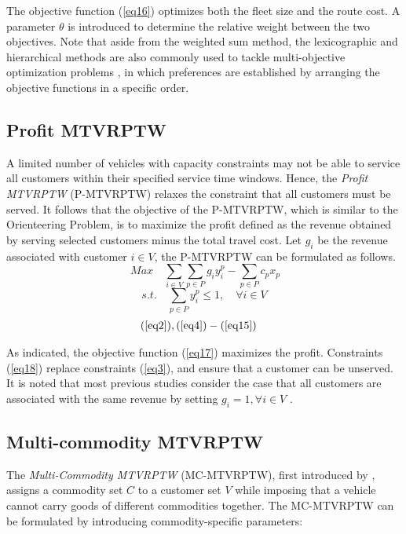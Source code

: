 \documentclass[11pt]{article}
\begin{document}
The objective function (\ref{eq16}) optimizes both the fleet size and the route cost.  A parameter $\theta$ is introduced to determine the relative weight between the two objectives.  Note that aside from the weighted sum method, the lexicographic and hierarchical methods are also commonly used to tackle multi-objective optimization problems \citep[e.g.,][]{arora2017multi}, in which preferences are established by arranging the objective functions in a specific order.

\subsection{Profit MTVRPTW}

A limited number of vehicles with capacity constraints may not be able to service all customers within their specified service time windows.  Hence, the \textit{Profit MTVRPTW} (P-MTVRPTW) relaxes the constraint that all customers must be served. It follows that the objective of the P-MTVRPTW, which is similar to the Orienteering Problem, is to maximize the profit defined as the revenue obtained by serving selected customers minus the total travel cost.  Let $g_i$ be the revenue associated with customer $i \in V$, the P-MTVRPTW can be formulated as follows.
\begin{equation} \ \label{eq17}
    Max \quad \sum_{i \in V} \sum_{p \in P} g_i y^p_i - \sum_{p \in P} c_p x_p
\end{equation}
\begin{equation} \label{eq18}
    s.t. \quad \sum_{p \in P} y^p_i \leq 1, \quad \forall i \in V
\end{equation}
\begin{align}
(\ref{eq2})&, (\ref{eq4})-(\ref{eq15}) \nonumber
\end{align}

As indicated, the objective function (\ref{eq17}) maximizes the profit. Constraints (\ref{eq18}) replace constraints (\ref{eq3}), and ensure that a customer can be unserved. It is noted that most previous studies consider the case that all customers are associated with the same revenue by setting $g_i = 1, \forall i \in V$ \citep[e.g.,][]{azi2010exact, macedo2011solving, macedo2012generalized, wang2014metaheuristic}.


\subsection{Multi-commodity MTVRPTW}
The \textit{Multi-Commodity MTVRPTW} (MC-MTVRPTW), first introduced by \cite{battarra2009adaptive}, assigns a commodity set $C$ to a customer set $V$ while imposing that a vehicle cannot carry goods of different commodities together.  The MC-MTVRPTW can be formulated by introducing commodity-specific parameters:
\end{document}
